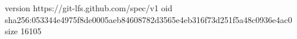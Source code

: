 version https://git-lfs.github.com/spec/v1
oid sha256:053344e4975f8de0005aeb84608782d3565e4eb316f73d251f5a48c0936e4ac0
size 16105
